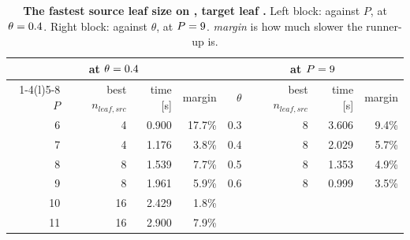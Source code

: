 \begin{table}[!htb]
\centering
\footnotesize
\caption[Fastest source leaf against $P$ and $\theta$]{\textbf{The fastest source
    leaf size on \shiftMoleculeleafoptimumshiftvyb{}, target leaf \shiftTgtleafoptimumshiftvyb{}.} Left block: against
    $P$, at $\theta = 0.4{}$. Right block: against $\theta$, at
    $P = 9{}$. \emph{margin} is how much slower the runner-up
    is.\shiftMachineleafoptimumshiftvyb}
\label{tab:leaf_optimum_shift_6vyb}
\begin{tabular}{rrrr@{\hskip 2em}rrrr}
\toprule
\multicolumn{4}{c}{at $\theta = 0.4{}$} & \multicolumn{4}{c}{at $P = 9{}$} \\
\cmidrule(r){1-4}\cmidrule(l){5-8}
$P$ & best $n_{leaf,src}$ & time [s] & margin & $\theta$ & best $n_{leaf,src}$ & time [s] & margin \\
\midrule
6 & 4 & 0.900 & 17.7\% & 0.3 & 8 & 3.606 & 9.4\% \\
7 & 4 & 1.176 & 3.8\% & 0.4 & 8 & 2.029 & 5.7\% \\
8 & 8 & 1.539 & 7.7\% & 0.5 & 8 & 1.353 & 4.9\% \\
9 & 8 & 1.961 & 5.9\% & 0.6 & 8 & 0.999 & 3.5\% \\
10 & 16 & 2.429 & 1.8\% &  & & &  \\
11 & 16 & 2.900 & 7.9\% &  & & &  \\

\bottomrule
\end{tabular}
\end{table}
